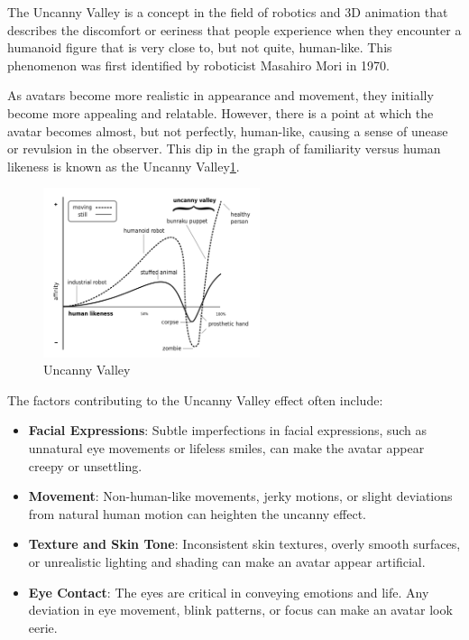 \documentclass[../../main.tex]{subfiles}
\begin{document}
The Uncanny Valley is a concept in the field of robotics and 3D animation that describes the discomfort or eeriness that people experience when they encounter a humanoid figure that is very close to, but not quite, human-like. This phenomenon was first identified by roboticist Masahiro Mori in 1970.

As avatars become more realistic in appearance and movement, they initially become more appealing and relatable. However, there is a point at which the avatar becomes almost, but not perfectly, human-like, causing a sense of unease or revulsion in the observer. This dip in the graph of familiarity versus human likeness is known as the Uncanny Valley\ref{fig:uncanny_valley_graph}.

\begin{figure}
  \centering \includegraphics[width = 2.5in]{chapters/background_work/images/uncanny_valley_graph.png}
  \caption{Uncanny Valley}
  \label{fig:uncanny_valley_graph}
\end{figure}

The factors contributing to the Uncanny Valley effect often include:
\begin{itemize}
  \item \textbf{Facial Expressions}: Subtle imperfections in facial expressions, such as unnatural eye movements or lifeless smiles, can make the avatar appear creepy or unsettling.
  \item \textbf{Movement}: Non-human-like movements, jerky motions, or slight deviations from natural human motion can heighten the uncanny effect.
  \item \textbf{Texture and Skin Tone}: Inconsistent skin textures, overly smooth surfaces, or unrealistic lighting and shading can make an avatar appear artificial.
  \item \textbf{Eye Contact}: The eyes are critical in conveying emotions and life. Any deviation in eye movement, blink patterns, or focus can make an avatar look eerie.
\end{itemize}
\end{document}
